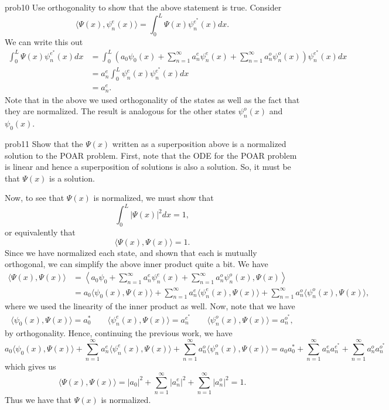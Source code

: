 \documentclass{article}
\begin{document}
\begin{solution}{}{prob10}
		Use orthogonality to show that the above statement is true.
		\tcblower
		Consider
		\[
		\langle \Psi(x),\psi_n^e(x)\rangle = \int_0^L \Psi(x)\psi_n^{e^*}(x)dx.
		\]
		We can write this out
		\begin{align*}
			 \int_0^L \Psi(x)\psi_n^{e^*}(x)dx &= \int_0^L \left(a_0 \psi_0(x) + \sum_{n=1}^\infty a_n^e \psi_n^e(x) + \sum_{n=1}^\infty a_n^o \psi_n^o(x)\right) \psi_n^{e^*}(x)dx\\
			 &= a_n^e\int_0^L \psi_n^e(x)\psi_n^{e^*}(x)dx\\
			 &= a_n^e.
		\end{align*}
		Note that in the above we used orthogonality of the states as well as the fact that they are normalized. The result is analogous for the other states $\psi_n^o(x)$ and $\psi_0(x)$.
	\end{solution}

\begin{solution}{}{prob11}
	Show that the $\Psi(x)$ written as a superposition above is a normalized solution to the POAR problem.
	\tcblower
	First, note that the ODE for the POAR problem is linear and hence a superposition of solutions is also a solution. So, it must be that $\Psi(x)$ is a solution.
	
	Now, to see that $\Psi(x)$ is normalized, we must show that
	\[
	\int_0^L |\Psi(x)|^2dx = 1,
	\]
	or equivalently that
	\[
	\langle \Psi(x), \Psi(x) \rangle = 1.
	\]
	Since we have normalized each state, and shown that each is mutually orthogonal, we can simplify the above inner product quite a bit.  We have
	\begin{align*}
		\langle \Psi(x),\Psi(x)\rangle &= \left\langle a_0 \psi_0 + \sum_{n=1}^\infty a_n^e \psi_n^e(x) + \sum_{n=1}^\infty a_n^o \psi_n^o(x), \Psi(x)\right\rangle\\
		&= a_0 \langle \psi_0(x),\Psi(x)\rangle +\sum_{n=1}^\infty a_n^e \langle \psi_n^e(x),\Psi(x)\rangle + \sum_{n=1}^\infty a_n^o \langle \psi_n^o(x),\Psi(x)\rangle,
	\end{align*}
	where we used the linearity of the inner product as well.  Now, note that we have
	\begin{align*}
		\langle \psi_0(x), \Psi(x)\rangle = a_0^* \qquad \langle \psi_n^e(x),\Psi(x)\rangle = a_n^{e^*} \qquad \langle \psi_n^o(x),\Psi(x)\rangle =a_n^{o^*},
	\end{align*}
	by orthogonality.  Hence, continuing the previous work, we have
	\[
	 a_0 \langle \psi_0(x),\Psi(x)\rangle +\sum_{n=1}^\infty a_n^e \langle \psi_n^e(x),\Psi(x)\rangle + \sum_{n=1}^\infty a_n^o \langle \psi_n^o(x),\Psi(x)\rangle = a_0a_0^* + \sum_{n=1}^\infty a_n^e a_n^{e^*}+\sum_{n=1}^\infty a_n^oa_n^{o^*}
	\]
	which gives us
	\[
	\langle \Psi(x),\Psi(x)\rangle = |a_0|^2 + \sum_{n=1}^\infty |a_n^e|^2 +\sum_{n=1}^\infty |a_n^o|^2 =1.
	\]
	Thus we have that $\Psi(x)$ is normalized.
	\end{solution}
\end{document}
